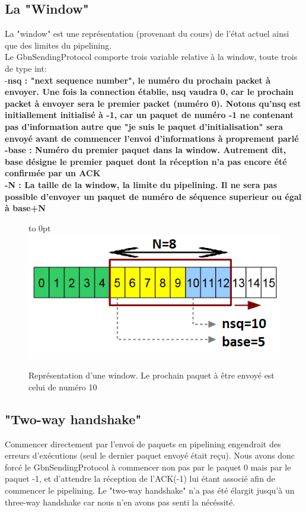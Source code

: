 \documentclass[11pt]{article}
\begin{document}
\subsection{La "Window"}
La "window" est une représentation (provenant du cours) de l'état actuel ainsi que des limites du pipelining. \\
Le GbnSendingProtocol comporte trois variable relative à la window, toute trois de type int: \\
-\bfseries nsq \mdseries : "next sequence number", le numéro du prochain packet à envoyer. Une fois la connection établie, nsq vaudra 0, car le prochain packet à envoyer sera le premier packet (numéro 0). Notons qu'nsq est initiallement initialisé à -1, car un paquet de numéro -1 ne contenant pas d'information autre que "je suis le paquet d'initialisation" sera envoyé avant de commencer l'envoi d'informations à proprement parlé \\
-\bfseries base \mdseries : Numéro du premier paquet dans la window. Autrement dit, base désigne le premier paquet dont la réception n'a pas encore été confirmée par un ACK \\
-\bfseries N \mdseries : La taille de la window, la limite du pipelining. Il ne sera pas possible d'envoyer un paquet de numéro de séquence superieur ou égal à base+N \\

\begin{figure}[h]
  \hfill\hbox to 0pt{\hss\includegraphics[scale=0.75]{window.png}\hss}\hfill\null
  \caption{Représentation d'une window. Le prochain paquet à être envoyé est celui de numéro 10}
\end{figure}

\subsection{"Two-way handshake"}
Commencer directement par l'envoi de paquets en pipelining engendrait des erreurs d'exécutions (seul le dernier paquet envoyé était reçu). Nous avons donc forcé le GbnSendingProtocol à commencer non pas par le paquet 0 mais par le paquet -1, et d'attendre la réception de l'ACK(-1) lui étant associé afin de commencer le pipelining. Le "two-way handshake" n'a pas été élargit jusqu'à un three-way handshake car nous n'en avons pas senti la nécéssité.
\end{document}
